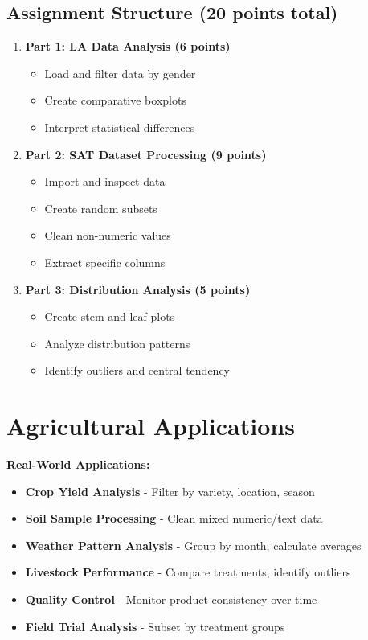 \documentclass[11pt,a4paper]{article}
\begin{document}
\subsection{Assignment Structure (20 points total)}

\begin{enumerate}
    \item \textbf{Part 1: LA Data Analysis (6 points)}
    \begin{itemize}
        \item Load and filter data by gender
        \item Create comparative boxplots
        \item Interpret statistical differences
    \end{itemize}
    
    \item \textbf{Part 2: SAT Dataset Processing (9 points)}
    \begin{itemize}
        \item Import and inspect data
        \item Create random subsets
        \item Clean non-numeric values
        \item Extract specific columns
    \end{itemize}
    
    \item \textbf{Part 3: Distribution Analysis (5 points)}
    \begin{itemize}
        \item Create stem-and-leaf plots
        \item Analyze distribution patterns
        \item Identify outliers and central tendency
    \end{itemize}
\end{enumerate}

\section{Agricultural Applications}

\begin{infobox}
\textbf{Real-World Applications:}
\begin{itemize}
    \item \textbf{Crop Yield Analysis} - Filter by variety, location, season
    \item \textbf{Soil Sample Processing} - Clean mixed numeric/text data
    \item \textbf{Weather Pattern Analysis} - Group by month, calculate averages
    \item \textbf{Livestock Performance} - Compare treatments, identify outliers
    \item \textbf{Quality Control} - Monitor product consistency over time
    \item \textbf{Field Trial Analysis} - Subset by treatment groups
\end{itemize}
\end{infobox}
\end{document}
